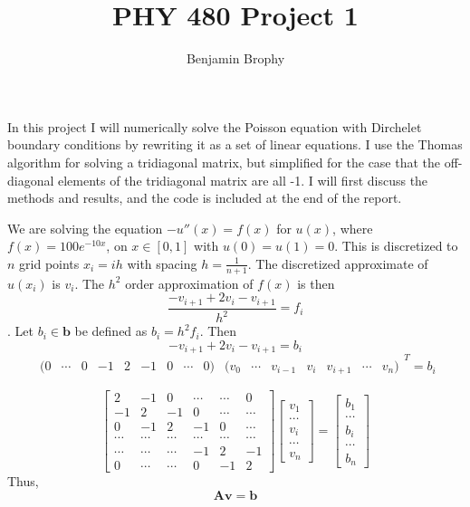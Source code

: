 \documentclass[11pt]{article}
\begin{document}
\title{PHY 480 Project 1}
\author{Benjamin Brophy}
\maketitle



In this project I will numerically solve the Poisson equation with Dirchelet boundary conditions by rewriting it as a set of linear equations. I use the Thomas algorithm for solving a tridiagonal matrix, but simplified for the case that the off-diagonal elements of the tridiagonal matrix are all -1. I will first discuss the methods and results, and the code is included at the end of the report.

We are solving the equation $-u''(x)=f(x)$ for $u(x)$, where $f(x)=100e^{-10x}$, on $x\in[0,1]$ with $u(0)=u(1)=0$. This is discretized to $n$ grid points $x_i=ih$ with spacing $h=\frac{1}{n+1}$. The discretized approximate of $u(x_i)$ is $v_i$. The $h^2$ order approximation of $f(x)$ is then $$\frac{-v_{i+1}+2v_i-v_{i+1}}{h^2}=f_i$$.
Let $b_i\in\mathbf{b}$ be defined as $b_i=h^2f_i$. Then
$$-v_{i+1}+2v_i-v_{i+1}=b_i$$
$$\begin{matrix}
(0& \cdots&0&-1& 2 & -1 & 0 & \cdots & 0)
\end{matrix}
\begin{matrix}
(v_0&\cdots&v_{i-1}&v_{i}&v_{i+1}&\cdots&v_n)
\end{matrix}^T=b_i$$

$$\begin{bmatrix}
2&-1&0&\cdots&\cdots&0\\
-1&2&-1&0&\cdots&\cdots\\
0&-1&2&-1&0&\cdots\\
\cdots&\cdots&\cdots&\cdots&\cdots&\cdots\\
\cdots&\cdots&\cdots&-1&2&-1\\
0&\cdots&\cdots&0&-1&2
\end{bmatrix}
\begin{bmatrix}
v_1\\\cdots\\v_i\\\cdots\\v_n
\end{bmatrix}
=
\begin{bmatrix}
b_1\\\cdots\\b_i\\\cdots\\b_n
\end{bmatrix}$$
Thus,
$$
\mathbf{Av}=\mathbf{b}
$$
\end{document}
